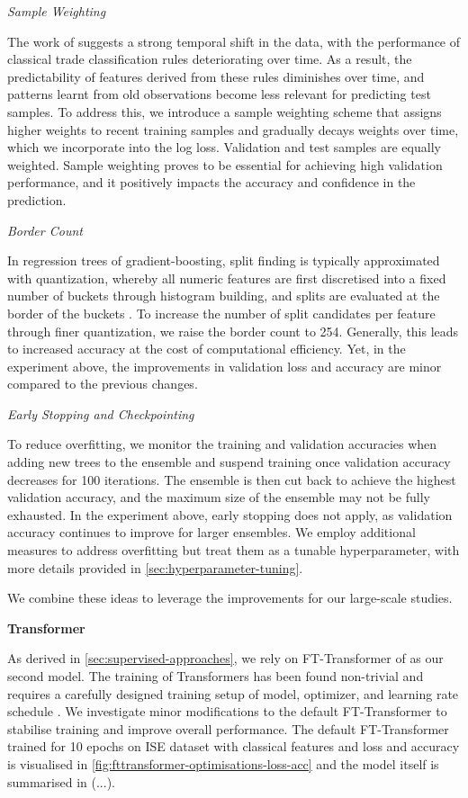 \emph{Sample Weighting}

The work of \textcite[][36--38]{grauerOptionTradeClassification2022} suggests a strong temporal shift in the data, with the performance of classical trade classification rules deteriorating over time.  As a result, the predictability of features derived from these rules diminishes over time, and patterns learnt from old observations become less relevant for predicting test samples. To address this, we introduce a sample weighting scheme that assigns higher weights to recent training samples and gradually decays weights over time, which we incorporate into the log loss. Validation and test samples are equally weighted. Sample weighting proves to be essential for achieving high validation performance, and it positively impacts the accuracy and confidence in the prediction.

\emph{Border Count}

In regression trees of gradient-boosting, split finding is typically approximated with quantization, whereby all numeric features are first discretised into a fixed number of buckets through histogram building, and splits are evaluated at the border of the buckets \autocites[][4]{dorogushCatBoostGradientBoosting}[][2]{keLightGBMHighlyEfficient2017}. To increase the number of split candidates per feature through finer quantization, we raise the border count to \num{254}. Generally, this leads to increased accuracy at the cost of computational efficiency. Yet, in the experiment above, the improvements in validation loss and accuracy are minor compared to the previous changes.

\emph{Early Stopping and Checkpointing}

To reduce overfitting, we monitor the training and validation accuracies when adding new trees to the ensemble and suspend training once validation accuracy decreases for 100 iterations. The ensemble is then cut back to achieve the highest validation accuracy, and the maximum size of the ensemble may not be fully exhausted. In the experiment above, early stopping does not apply, as validation accuracy continues to improve for larger ensembles. We employ additional measures to address overfitting but treat them as a tunable hyperparameter, with more details provided in \cref{sec:hyperparameter-tuning}.

We combine these ideas to leverage the improvements for our large-scale studies.

\textbf{Transformer}

As derived in \cref{sec:supervised-approaches}, we rely on FT-Transformer of \textcite[][4--5]{gorishniyRevisitingDeepLearning2021} as our second model. The training of Transformers has been found non-trivial and requires a carefully designed training setup of model, optimizer, and learning rate schedule \autocite[][1]{liuUnderstandingDifficultyTraining2020}. We investigate minor modifications to the default FT-Transformer to stabilise training and improve overall performance. The default FT-Transformer trained for 10 epochs on \gls{ISE} dataset with classical features and loss and accuracy is visualised in \cref{fig:fttransformer-optimisations-loss-acc} and the model itself is summarised in (...).

